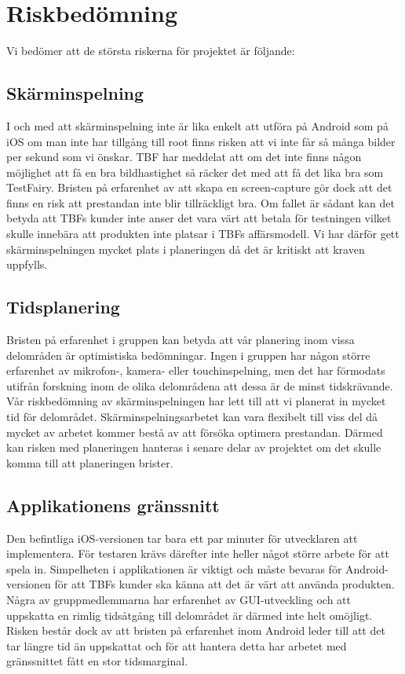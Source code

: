 \section{Riskbedömning}

Vi bedömer att de största riskerna för projektet är följande:

\subsection{Skärminspelning}
I och med att skärminspelning inte är lika enkelt att utföra på Android som på iOS om man inte har tillgång till root finns risken att vi inte får så många bilder per sekund som vi önskar. TBF har meddelat att om det inte finns någon möjlighet att få en bra bildhastighet så räcker det med att få det lika bra som TestFairy. Bristen på erfarenhet av att skapa en screen-capture gör dock att det finns en risk att prestandan inte blir tillräckligt bra. Om fallet är sådant kan det betyda att TBFs kunder inte anser det vara värt att betala för testningen vilket skulle innebära att produkten inte platsar i TBFs affärsmodell. Vi har därför gett skärminspelningen mycket plats i planeringen då det är kritiskt att kraven uppfylls.

\subsection{Tidsplanering}
Bristen på erfarenhet i gruppen kan betyda att vår planering inom vissa delområden är optimistiska bedömningar. Ingen i gruppen har någon större erfarenhet av mikrofon-, kamera- eller touchinspelning, men det har förmodats utifrån forskning inom de olika delområdena att dessa är de minst tidskrävande. Vår riskbedömning av skärminspelningen har lett till att vi planerat in mycket tid för delområdet. Skärminspelningsarbetet kan vara flexibelt till viss del då mycket av arbetet kommer bestå av att försöka optimera prestandan. Därmed kan risken med planeringen hanteras i senare delar av projektet om det skulle komma till att planeringen brister.

\subsection{Applikationens gränssnitt}
Den befintliga iOS-versionen tar bara ett par minuter för utvecklaren att implementera. För testaren krävs därefter inte heller något större arbete för att spela in. Simpelheten i applikationen är viktigt och måste bevaras för Android-versionen för att TBFs kunder ska känna att det är värt att använda produkten. Några av gruppmedlemmarna har erfarenhet av GUI-utveckling och att uppskatta en rimlig tidsåtgång till delområdet är därmed inte helt omöjligt. Risken består dock av att bristen på erfarenhet inom Android leder till att det tar längre tid än uppskattat och för att hantera detta har arbetet med gränssnittet fått en stor tidsmarginal.